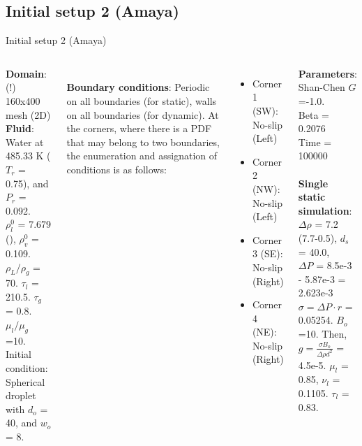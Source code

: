 \documentclass[8pt]{beamer}
\begin{document}
	\subsection*{Initial setup 2 (Amaya)}
	\begin{frame}[t]{Initial setup 2 (Amaya)}
		\justifying
		\begin{columns}[t]
			
			\textbf{Domain}: (!) 160x400 mesh (2D)\\
			\textbf{Fluid}: Water at 485.33 K ($T_r$ = 0.75), and $P_r$ = 0.092. \\$\rho_l^0$  = 7.679 (), $\rho_v^0$  = 0.109. $\rho_L/\rho_g$ = 70. $\tau_l$ = 210.5. $\tau_g$ = 0.8. $\mu_l/\mu_g$ =10.\\
			Initial condition: Spherical droplet with $d_o$ = 40, and $w_o$ = 8.
			
			~\\
			\textbf{Boundary conditions}: Periodic on all boundaries (for static), walls on all boundaries (for dynamic). At the corners, where there is a PDF that may belong to two boundaries, the enumeration and assignation of conditions is as follows:
			\begin{itemize}
				\item Corner 1 (SW): No-slip (Left)
				\item Corner 2 (NW): No-slip (Left)
				\item Corner 3 (SE): No-slip (Right)
				\item Corner 4 (NE): No-slip (Right)
			\end{itemize}
			
			
			
			
			
			\textbf{Parameters}: Shan-Chen $G$=-1.0. \\
			Beta = 0.2076\\
			Time = 100000\\
			
			~\\
			\textbf{Single static simulation}:\\ $\Delta \rho $ = 7.2 (7.7-0.5), $d_s$ = 40.0, \\ $\Delta P$ = 8.5e-3 - 5.87e-3 = 2.623e-3 \\$\sigma = \Delta P \cdot r$ = 0.05254.
			$B_o$ =10. Then, $g = \frac{\sigma B_o}{\Delta \rho d^2}$ = 4.5e-5. $\mu_l $ = 0.85, $\nu_l$ = 0.1105. $\tau_l$ = 0.83.  
		\end{columns}
	\end{frame}
\end{document}
